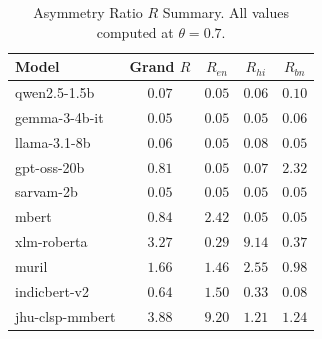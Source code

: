 \begin{table}[t]
\centering
\caption{Asymmetry Ratio $R$ Summary. All values computed at $\theta = 0.7$.}
\label{tab:R_summary}
\begin{tabular}{lcccc}
\toprule
Model & Grand $R$ & $R_{en}$ & $R_{hi}$ & $R_{bn}$ \\
\midrule
  qwen2.5-1.5b & $0.07$ & $0.05$ & $0.06$ & $0.10$ \\
  gemma-3-4b-it & $0.05$ & $0.05$ & $0.05$ & $0.06$ \\
  llama-3.1-8b & $0.06$ & $0.05$ & $0.08$ & $0.05$ \\
  gpt-oss-20b & $0.81$ & $0.05$ & $0.07$ & $2.32$ \\
  sarvam-2b & $0.05$ & $0.05$ & $0.05$ & $0.05$ \\
  mbert & $0.84$ & $2.42$ & $0.05$ & $0.05$ \\
  xlm-roberta & $3.27$ & $0.29$ & $9.14$ & $0.37$ \\
  muril & $1.66$ & $1.46$ & $2.55$ & $0.98$ \\
  indicbert-v2 & $0.64$ & $1.50$ & $0.33$ & $0.08$ \\
  jhu-clsp-mmbert & $3.88$ & $9.20$ & $1.21$ & $1.24$ \\
\bottomrule
\end{tabular}
\end{table}